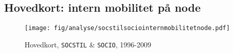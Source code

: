 



\newpage \subsection{Hovedkort: intern mobilitet på node \label{}}

\begin{figure}[H]
\begin{centering}
	\caption{Hovedkort, \texttt{SOCSTIL} \& \texttt{SOCIO}, 1996-2009}
	\texttt{[image: fig/analyse/socstilsociointernmobilitetnode.pdf]}
	\label{fig_hist_beskaeftigede_allekategorier132}
\end{centering}
\end{figure}





